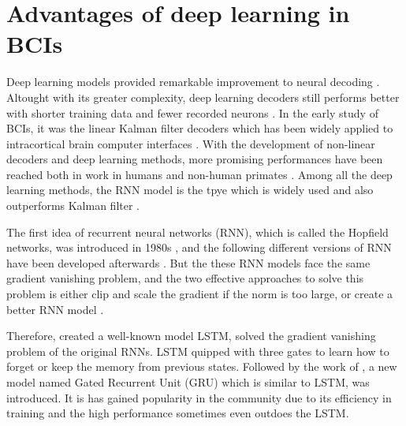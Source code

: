 
\section{Advantages of deep learning in BCIs}
Deep learning models provided remarkable improvement to neural decoding \citep{hosman2019bci}.
Altought with its greater complexity, deep learning decoders still performs better with shorter training data and fewer recorded neurons \citep{glaser2020machine}.
In the early study of BCIs, it was the linear Kalman filter decoders which has been widely applied to intracortical brain computer interfaces \citep{jarosiewicz2015virtual, pandarinath2017high,nuyujukian2018cortical}.
With the development of non-linear decoders and deep learning methods, 
more promising performances have been reached both in work in humans and non-human primates \citep{shanechi2017rapid, sussillo2016making, milstein2017multiscale, pandarinath2018inferring}.
Among all the deep learning methods, 
the RNN model is the tpye which is widely used and also outperforms Kalman filter \citep{sussillo2016making}.


The first idea of recurrent neural networks (RNN), which is called the Hopfield networks, was introduced in 1980s \citep{hopfield1982neural}, 
and the following different versions of RNN have been developed afterwards \citep{elman1990finding, jordan1997serial}.
But the these RNN models face the same gradient vanishing problem, and the two effective approaches to solve this problem is either clip and scale the gradient if the norm is too large, 
or create a better RNN model \citep{alom2018history}.


Therefore, \cite{hochreiter1997long} created a well-known model LSTM, solved the gradient vanishing problem of the original RNNs. LSTM quipped with three gates to learn how to forget or keep the memory from previous states. 
Followed by the work of \cite{chung2014empirical}, a new model named Gated Recurrent Unit (GRU) which is similar to LSTM, was introduced. 
It is has gained popularity in the community due to its efficiency in training and the high performance sometimes even outdoes the LSTM. 


